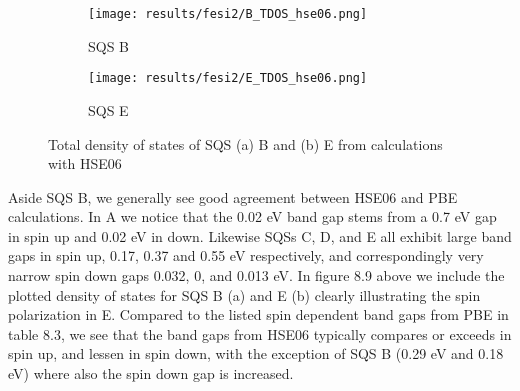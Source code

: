 \begin{figure}[H]
	\centering	
	\begin{subfigure}{.8\textwidth}
		\texttt{[image: results/fesi2/B\_TDOS\_hse06.png]}
		\caption{SQS B}
	\end{subfigure}
	\begin{subfigure}{.8\textwidth}
		\texttt{[image: results/fesi2/E\_TDOS\_hse06.png]}
		\caption{SQS E}
	\end{subfigure}
	\caption{Total density of states of SQS (a) B and  (b) E from calculations with HSE06}
\end{figure}

Aside SQS B, we generally see good agreement between HSE06 and PBE calculations. In A we notice that the 0.02 eV band gap stems from a 0.7 eV gap in spin up and 0.02 eV in down. Likewise SQSs C, D, and E all exhibit large band gaps in spin up, 0.17, 0.37 and 0.55 eV respectively, and correspondingly very narrow spin down gaps 0.032, 0, and 0.013 eV. In figure 8.9 above we include the plotted density of states for SQS B (a) and E (b) clearly illustrating the spin polarization in E. Compared to the listed spin dependent band gaps from PBE in table 8.3, we see that the band gaps from HSE06 typically compares or exceeds in spin up, and lessen in spin down, with the exception of SQS B (0.29 eV and 0.18 eV) where also the spin down gap is increased. 


